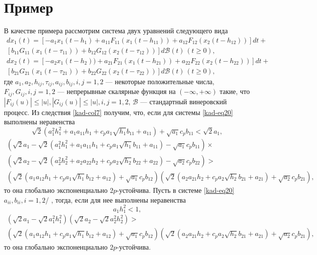 \section{Пример}
В качестве примера рассмотрим система двух уравнений следующего
вида
\begin{equation}\label{kad-eq20}
\begin{array}{crl}
dx_1(t) = \left [-a_{1}x_1(t-h_1)+ a_{11} F_{11}(x_1(t-h_{11}))+
a_{12} F_{12}(x_2(t-h_{12})) \right ]dt+ \\
 \left [b_{11}G_{11}(x_1(t-\tau _{11})) + b_{12}G_{12}(x_2(t-\tau _{12}))\right ]d\mathcal B(t)
\, (t \ge 0),\\
dx_2(t) = \left [-a_{2}x_1(t-h_2))+ a_{21} F_{21}(x_1(t-h_{21}))+
a_{22} F_{22}(x_2(t-h_{22})) \right ]dt+ \\
 \left [b_{21}G_{21}(x_1(t-\tau _{21})) + b_{22}G_{22}(x_2(t-\tau _{22}))\right ]d\mathcal B(t)
\, (t \ge 0),
\end{array}
\end{equation}
где $a_1, a_2, h_{ij}, \tau _{ij}, a_{ij}, b_{ij}, i, j = 1,2 $ ---
некоторые положительные числа, $F_{ij}, G_{ij}, i, j = 1, 2$ ---
непрерывные скалярные функция на $(-\infty, +\infty)$ такие, что
$|F_{ij}(u)| \leq |u|, |G_{ij}(u)| \leq |u|, i, j = 1, 2$, $\mathcal
B$ --- стандартный винеровский процесс.
Из следствия \ref{kad-col7} получим, что, если для системы \eqref{kad-eq20} выполнены
неравенства
$$
\sqrt{2}(a_1^2h_1^2 + a_1a_{11}h_1  + c_p a_1 \sqrt{h_1}b_{11} +
a_{11}) + \sqrt{a_1}c_pb_{11} < \sqrt{2}a_1,
$$
$$
\begin{array}{crl}
(\sqrt{2}a_1 - \sqrt{2}(a_1^2h_1^2 + a_1a_{11}h_1 + c_p a_1
\sqrt{h_1}b_{11} + a_{11}) - \sqrt{a_1}c_pb_{11}) \times  \\
(\sqrt{2}a_2 - \sqrt{2}(a_2^2h_2^2 + a_2a_{22}h_2 + c_p a_2
\sqrt{h_2}b_{22} + a_{22}) - \sqrt{a_2}c_pb_{22})
>
\\
(\sqrt{2}(a_1a_{12}h_1 + c_p a_1 \sqrt{h_1}b_{12} + a_{12}) +
\sqrt{a_1}c_pb_{12})(\sqrt{2}(a_2a_{21}h_2 + c_p a_2
\sqrt{h_2}b_{21} + a_{21}) + \sqrt{a_2} c_pb_{21}),
\end{array}
$$
то она глобально экспоненциально $2p$-устойчива.
Пусть в системе \eqref{kad-eq20} $a_{ii}, b_{ii}, i = 1,2 $/ , тогда, если для
нее выполнены неравенства
$$
a_1h_1^2 < 1,
$$
$$
\begin{array}{crl}
(\sqrt{2}a_1 - \sqrt{2}a_1^2h_1^2)(\sqrt{2}a_2 - \sqrt{2}a_2^2h_2^2)
> \\
(\sqrt{2}(a_1a_{12}h_1 + c_p a_1 \sqrt{h_1}b_{12} + a_{12}) +
\sqrt{a_1}c_pb_{12})(\sqrt{2}(a_2a_{21}h_2 + c_p a_2
\sqrt{h_2}b_{21} + a_{21}) + \sqrt{a_2} c_pb_{21}),
\end{array}
$$
то она глобально экспоненциально $2p$-устойчива. 